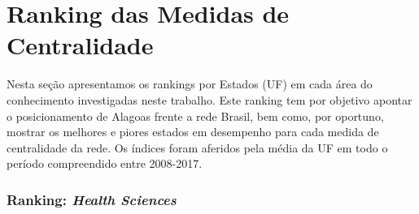 
\section{\textbf{Ranking das Medidas de Centralidade}}

Nesta seção apresentamos os rankings por Estados (UF) em cada área do conhecimento investigadas neste trabalho. Este ranking tem por objetivo apontar o posicionamento de Alagoas frente a rede Brasil, bem como, por oportuno, mostrar os melhores e piores estados em desempenho para cada medida de centralidade da rede. Os índices foram aferidos pela média da UF em todo o período compreendido entre 2008-2017.

\subsubsection{Ranking: \textit{Health Sciences}}

